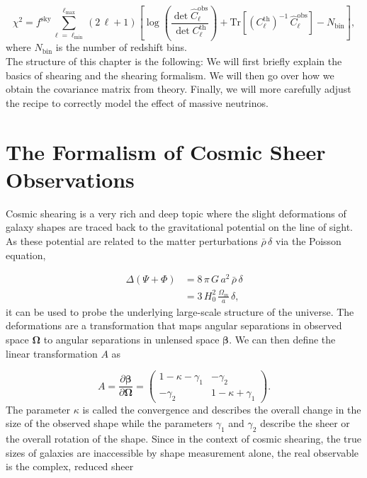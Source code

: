 \documentclass[oneside]{book}
\begin{document}
\begin{equation}
    \chi^2 = f^\mathrm{sky} \sum_{\ell=\ell_\mathrm{min}}^{\ell_\mathrm{max}} (2\,\ell+1)\left[\log\left(\frac{\det \hat{C}_\ell^\mathrm{obs}}{\det C_\ell^\mathrm{th}}\right) + \mathrm{Tr}\left[\left(C_\ell^\mathrm{th}\right)^{-1}\,\hat{C}^\mathrm{obs}_\ell\right]-N_\mathrm{bin}\right],
\end{equation}
where $N_\mathrm{bin}$ is the number of redshift bins.\\
The structure of this chapter is the following: We will first briefly explain the basics of shearing and the shearing formalism. We will then go over how we obtain the covariance matrix from theory. Finally, we will more carefully adjust the recipe to correctly model the effect of massive neutrinos.

\section{The Formalism of Cosmic Sheer Observations}
Cosmic shearing is a very rich and deep topic where the slight deformations of galaxy shapes are traced back to the gravitational potential on the line of sight. As these potential are related to the matter perturbations $\bar{\rho}\,\delta$ via the Poisson equation, 

\begin{align*}
    \Delta (\Psi+\Phi) &= 8\,\pi\, G\,a^2\,\bar{\rho}\,\delta\\
                       &= 3\, H_0^2\, \frac{\Omega_m}{a}\, \delta,
\end{align*}
it can be used to probe the underlying large-scale structure of the universe. The deformations are a transformation that maps angular separations in observed space $\boldsymbol{\Omega}$ to angular separations in unlensed space $\boldsymbol{\beta}$. We can then define the linear transformation $A$ as 

\begin{equation}
    A = \frac{\partial \boldsymbol{\beta}}{\partial \boldsymbol{\Omega}} = \left(\begin{array}{cc}
        1-\kappa-\gamma_1 & -\gamma_2\\
        -\gamma_2 & 1-\kappa+\gamma_1        
    \end{array} \right).
\end{equation}
The parameter $\kappa$ is called the convergence and describes the overall change in the size of the observed shape while the parameters $\gamma_1$ and $\gamma_2$ describe the sheer or the overall rotation of the shape. Since in the context of cosmic shearing, the true sizes of galaxies are inaccessible by shape measurement alone, the real observable is the complex, reduced sheer 
\end{document}
